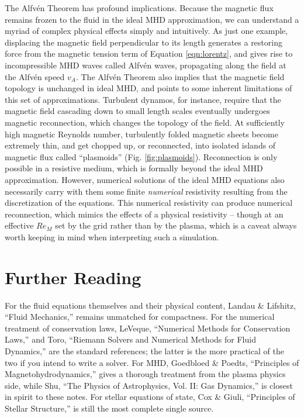 \documentclass[notoc]{tufte-handout}
\begin{document}
The Alfv\'en Theorem has profound implications. Because the magnetic flux remains frozen to the fluid in the ideal MHD approximation, we can understand a myriad of complex physical effects simply and intuitively. As just one example, displacing the magnetic field perpendicular to its length generates a restoring force from the magnetic tension term of Equation \ref{eqn:lorentz}, and gives rise to incompressible MHD waves called Alfv\'en waves, propagating along the field at the Alfv\'en speed $v_A$.
The Alfv\'en Theorem also implies that the magnetic field topology is unchanged in ideal MHD, and points to some inherent limitations of this set of approximations. Turbulent dynamos, for instance, require that the magnetic field cascading down to small length scales eventually undergoes magnetic reconnection, which changes the topology of the field. At sufficiently high magnetic Reynolds number, turbulently folded magnetic sheets become extremely thin, and get chopped up, or reconnected,  into isolated islands of magnetic flux called ``plasmoids'' (Fig. \ref{fig:plasmoids}).
Reconnection is only possible in a resistive medium, which is formally beyond the ideal MHD approximation. However, numerical solutions of the ideal MHD equations also necessarily carry with them some finite {\it numerical} resistivity resulting from the discretization of the equations. This numerical resistivity can produce numerical reconnection, which mimics the effects of a physical resistivity -- though at an effective $Re_M$ set by the grid rather than by the plasma, which is a caveat always worth keeping in mind when interpreting such a simulation.

\section{Further Reading}

For the fluid equations themselves and their physical content, Landau \& Lifshitz, ``Fluid Mechanics,'' remains unmatched for compactness. For the numerical treatment of conservation laws, LeVeque, ``Numerical Methods for Conservation Laws,'' and Toro, ``Riemann Solvers and Numerical Methods for Fluid Dynamics,'' are the standard references; the latter is the more practical of the two if you intend to write a solver. For MHD, Goedbloed \& Poedts, ``Principles of Magnetohydrodynamics,'' gives a thorough treatment from the plasma physics side, while Shu, ``The Physics of Astrophysics, Vol. II: Gas Dynamics,'' is closest in spirit to these notes. For stellar equations of state, Cox \& Giuli, ``Principles of Stellar Structure,'' is still the most complete single source.
\end{document}
